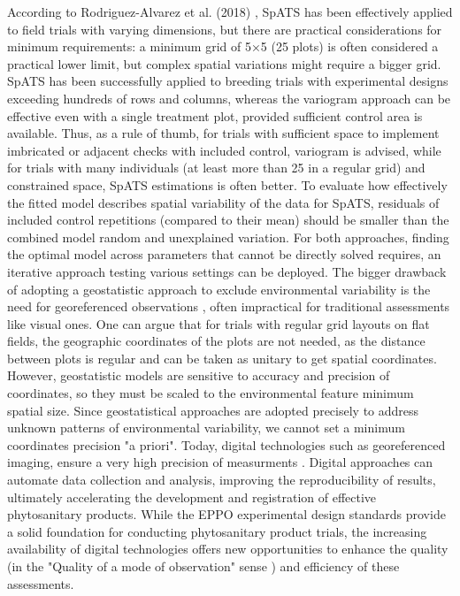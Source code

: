 \documentclass[12pt,a4paper,oneside]{report}
\begin{document}
According to Rodriguez-Alvarez et al. (2018) 
\cite{rodriguez-alvarezCorrectingSpatialHeterogeneity2018}, 
SpATS has been effectively applied 
to field trials with varying dimensions, but there are practical considerations 
for minimum requirements: a minimum grid of 5×5 (25 plots) is often considered a 
practical lower limit, but complex spatial variations might require a bigger grid.
SpATS has been successfully applied to breeding trials with experimental designs 
exceeding hundreds of rows and columns, whereas the variogram approach can be effective 
even with a single treatment plot, provided sufficient control area is available.
Thus, as a rule of thumb, for trials with sufficient space to implement imbricated
or adjacent checks with included control, variogram is advised,
while for trials with many individuals (at least more than 25 in a regular grid) 
and constrained space, SpATS estimations is often better.
To evaluate how effectively the fitted model describes spatial variability of the 
data for SpATS, 
residuals of included control repetitions (compared to their mean) should be 
smaller than the combined model random and unexplained variation.
For both approaches, finding the optimal model across parameters that cannot be 
directly solved requires, 
an iterative approach testing various settings can be deployed. 
The bigger drawback of adopting a geostatistic approach to exclude environmental
variability is the need for georeferenced observations 
\cite{oliver_geostatistics_2010, webster_geostatistics_2007}, 
often impractical for traditional
assessments like visual ones. One can argue that for trials with regular grid 
layouts on flat fields, the geographic coordinates of the plots are not needed, as
the distance between plots is regular and can be taken as unitary to get spatial coordinates.
However, geostatistic models are sensitive to accuracy and precision of coordinates,
so they must be scaled to the environmental feature minimum spatial size. 
Since geostatistical approaches are adopted precisely to address unknown patterns 
of environmental variability, 
we cannot set a minimum coordinates precision "a priori".
Today, digital technologies such as georeferenced imaging, ensure a very high precision
of measurments \cite{mahlein_plant_2016}.    
Digital approaches can automate data collection and analysis, improving the
reproducibility of results, ultimately accelerating the development and registration of
effective phytosanitary products.
While the EPPO experimental design standards provide a solid foundation for conducting
phytosanitary product trials, the increasing availability of digital technologies
offers new opportunities to enhance the quality (in the "Quality of a mode of observation" sense \cite{EPPO_PP1_152}) 
and efficiency of these assessments.
\end{document}
